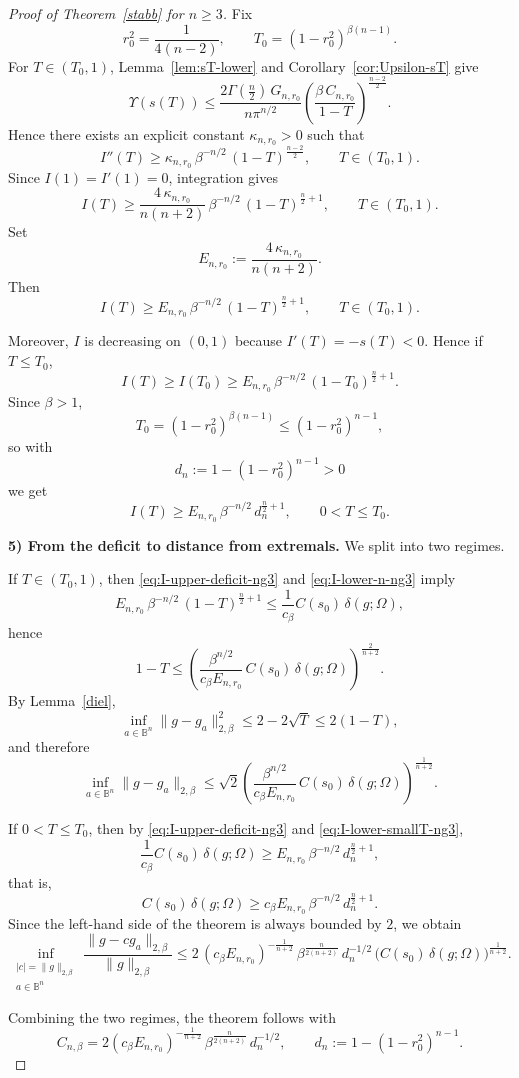 \documentclass[a4paper,10pt]{amsart}
\begin{document}
\begin{proof}[Proof of Theorem~\ref{stabb} for $n\ge 3$]
Fix
\[
r_0^2=\frac1{4(n-2)},\qquad T_0=(1-r_0^2)^{\beta(n-1)}.
\]
For $T\in(T_0,1)$, Lemma~\ref{lem:sT-lower} and Corollary~\ref{cor:Upsilon-sT} give
\[
\Upsilon(s(T))\le
\frac{2\Gamma(\frac n2)\,G_{n,r_0}}{n\pi^{n/2}}
\left(\frac{\beta\,C_{n,r_0}}{1-T}\right)^{\frac{n-2}{2}}.
\]
Hence there exists an explicit constant $\kappa_{n,r_0}>0$ such that
\[
I''(T)\ge \kappa_{n,r_0}\,\beta^{-n/2}\,(1-T)^{\frac{n-2}{2}},
\qquad T\in(T_0,1).
\]
Since $I(1)=I'(1)=0$, integration gives
\[
I(T)\ge
\frac{4\,\kappa_{n,r_0}}{n(n+2)}\,\beta^{-n/2}\,(1-T)^{\frac n2+1},
\qquad T\in(T_0,1).
\]
Set
\[
E_{n,r_0}:=\frac{4\,\kappa_{n,r_0}}{n(n+2)}.
\]
Then
\begin{equation}\label{eq:I-lower-n-ng3}
I(T)\ge E_{n,r_0}\,\beta^{-n/2}\,(1-T)^{\frac n2+1},
\qquad T\in(T_0,1).
\end{equation}

Moreover, $I$ is decreasing on $(0,1)$ because $I'(T)=-s(T)<0$. Hence if $T\le T_0$,
\[
I(T)\ge I(T_0)\ge E_{n,r_0}\,\beta^{-n/2}\,(1-T_0)^{\frac n2+1}.
\]
Since $\beta>1$,
\[
T_0=(1-r_0^2)^{\beta(n-1)}\le (1-r_0^2)^{n-1},
\]
so with
\[
d_n:=1-(1-r_0^2)^{n-1}>0
\]
we get
\begin{equation}\label{eq:I-lower-smallT-ng3}
I(T)\ge E_{n,r_0}\,\beta^{-n/2}\,d_n^{\frac n2+1},
\qquad 0<T\le T_0.
\end{equation}

\smallskip\noindent
\textbf{5) From the deficit to distance from extremals.}
We split into two regimes.

If $T\in(T_0,1)$, then \eqref{eq:I-upper-deficit-ng3} and \eqref{eq:I-lower-n-ng3} imply
\[
E_{n,r_0}\,\beta^{-n/2}\,(1-T)^{\frac n2+1}
\le
\frac1{c_\beta}C(s_0)\,\delta(g;\Omega),
\]
hence
\[
1-T
\le
\left(
\frac{\beta^{n/2}}{c_\beta E_{n,r_0}}\,
C(s_0)\,\delta(g;\Omega)
\right)^{\frac{2}{n+2}}.
\]
By Lemma~\ref{diel},
\[
\inf_{a\in\mathbb B^n}\|g-g_a\|_{2,\beta}^2\le 2-2\sqrt{T}\le 2(1-T),
\]
and therefore
\[
\inf_{a\in\mathbb B^n}\|g-g_a\|_{2,\beta}
\le
\sqrt2
\left(
\frac{\beta^{n/2}}{c_\beta E_{n,r_0}}\,
C(s_0)\,\delta(g;\Omega)
\right)^{\frac1{n+2}}.
\]

If $0<T\le T_0$, then by \eqref{eq:I-upper-deficit-ng3} and \eqref{eq:I-lower-smallT-ng3},
\[
\frac1{c_\beta}C(s_0)\,\delta(g;\Omega)
\ge
E_{n,r_0}\,\beta^{-n/2}\,d_n^{\frac n2+1},
\]
that is,
\[
C(s_0)\,\delta(g;\Omega)
\ge
c_\beta E_{n,r_0}\,\beta^{-n/2}\,d_n^{\frac n2+1}.
\]
Since the left-hand side of the theorem is always bounded by $2$, we obtain
\[
\inf_{\substack{|c|=\|g\|_{2,\beta}\\ a\in\mathbb B^n}}
\frac{\|g-cg_a\|_{2,\beta}}{\|g\|_{2,\beta}}
\le
2\,(c_\beta E_{n,r_0})^{-\frac1{n+2}}\,
\beta^{\frac{n}{2(n+2)}}\,d_n^{-1/2}\,
\bigl(C(s_0)\,\delta(g;\Omega)\bigr)^{\frac1{n+2}}.
\]

Combining the two regimes, the theorem follows with
\[
C_{n,\beta}
=
2(c_\beta E_{n,r_0})^{-\frac1{n+2}}\,
\beta^{\frac{n}{2(n+2)}}
\,d_n^{-1/2},
\qquad
d_n:=1-(1-r_0^2)^{n-1}.
\]
\end{proof}
\end{document}
